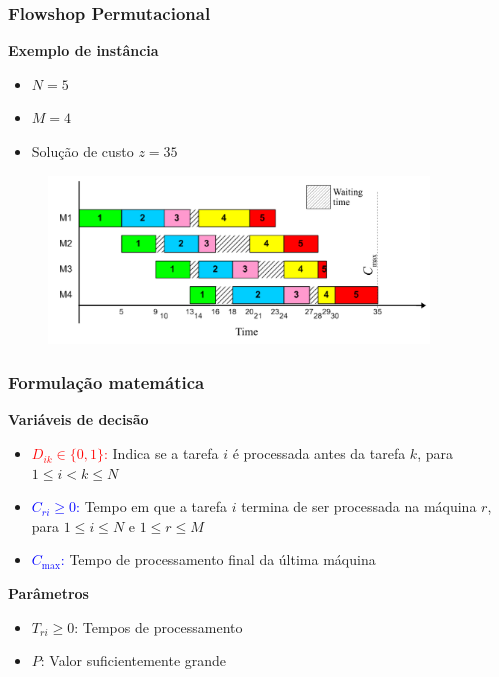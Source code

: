 \documentclass[professionalfonts]{beamer}
\begin{document}
\begin{frame}
   \frametitle{Flowshop Permutacional}

   \medskip
   \textbf{Exemplo de instância}
   \begin{itemize}
      \item $N = 5$
      \item $M = 4$
      \item Solução de custo $z = 35$
   \end{itemize}

   \begin{figure}
      \includegraphics[width=0.9\textwidth]{img/pfsp-my}
   \end{figure}
\end{frame}

\begin{frame}
   \frametitle{Formulação matemática}

   \textbf{Variáveis de decisão}
   \begin{itemize}
      \item \textcolor{red}{$D_{ik} \in \{0,1\}$:} Indica se a tarefa $i$ é
         processada antes da tarefa $k$, para $1 \leqslant i < k \leqslant N$
      \item \textcolor{blue}{$C_{ri} \geqslant 0$:} Tempo em que a tarefa $i$
         termina de ser processada na máquina $r$, para $1 \leqslant i 
         \leqslant N$ e $1 \leqslant r \leqslant M$
      \item \textcolor{blue}{$C_\mathrm{max}$:} Tempo de processamento final da
         última máquina
   \end{itemize}

   \medskip
   \textbf{Parâmetros}
   \begin{itemize}
      \item $T_{ri} \geqslant 0$: Tempos de processamento
      \item $P$: Valor suficientemente grande
   \end{itemize}
\end{frame}
\end{document}
